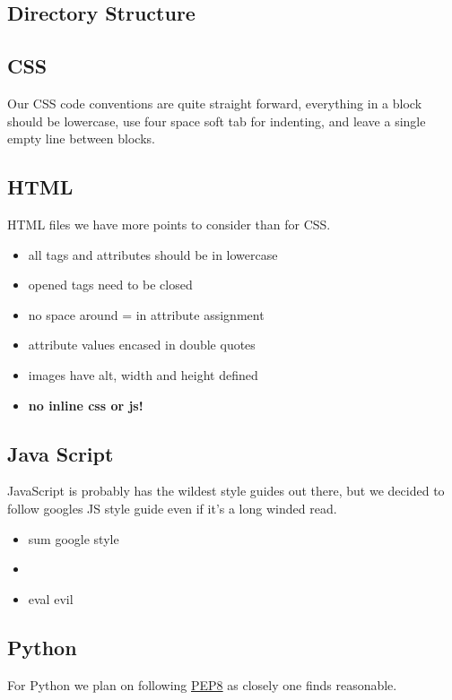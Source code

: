 \subsection{Directory Structure}


\subsection{CSS}
Our CSS code conventions are quite straight forward, everything in a block should be lowercase, use four space soft tab for indenting, and leave a single empty line between blocks.

\subsection{HTML}
HTML files we have more points to consider than for CSS.

\begin{itemize}
	\item all tags and attributes should be in lowercase
	\item opened tags need to be closed
	\item no space around = in attribute assignment
	\item attribute values encased in double quotes
	\item images have alt, width and height defined
	\item \textbf{no inline css or js!}
\end{itemize}

\subsection{Java Script}
JavaScript is probably has the wildest style guides out there, but we decided to follow googles JS style guide even if it's a long winded read.
\begin{itemize}
	\item sum google style
	\item %
	\item eval evil
\end{itemize}

\subsection{Python}
For Python we plan on following \href{https://peps.python.org/pep-0008/}{PEP8} as closely one finds reasonable.\\

